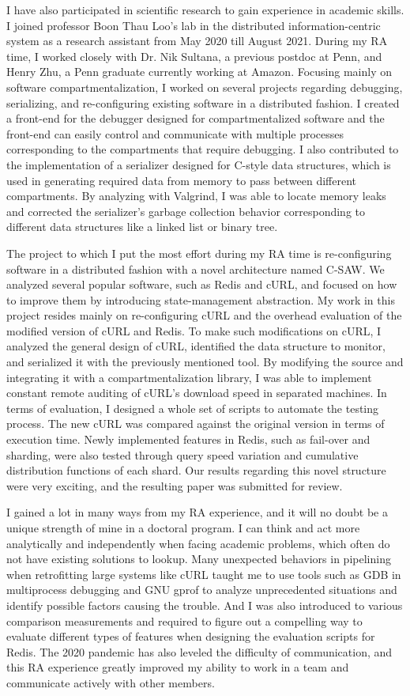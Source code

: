 \documentclass[12pt]{article}
\begin{document}
I have also participated in scientific research to gain experience in academic
skills. I joined professor Boon Thau Loo's lab in the distributed
information-centric system as a research assistant from May 2020 till August
2021. During my RA time, I worked closely with Dr. Nik Sultana, a previous
postdoc at Penn, and Henry Zhu, a Penn graduate currently working at Amazon.
Focusing mainly on software compartmentalization, I worked on several projects
regarding debugging, serializing, and re-configuring existing software in a
distributed fashion. I created a front-end for the debugger designed for
compartmentalized software and the front-end can easily control and communicate
with multiple processes corresponding to the compartments that require
debugging. I also contributed to the implementation of a serializer designed for
C-style data structures, which is used in generating required data from memory
to pass between different compartments. By analyzing with Valgrind, I was able
to locate memory leaks and corrected the serializer's garbage collection
behavior corresponding to different data structures like a linked list or binary
tree.

The project to which I put the most effort during my RA time is re-configuring
software in a distributed fashion with a novel architecture named C-SAW. We
analyzed several popular software, such as Redis and cURL, and focused on how to
improve them by introducing state-management abstraction. My work in this
project resides mainly on re-configuring cURL and the overhead evaluation of the
modified version of cURL and Redis. To make such modifications on cURL, I
analyzed the general design of cURL, identified the data structure to monitor,
and serialized it with the previously mentioned tool. By modifying the source
and integrating it with a compartmentalization library, I was able to implement
constant remote auditing of cURL's download speed in separated machines. In
terms of evaluation, I designed a whole set of scripts to automate the testing
process. The new cURL was compared against the original version in terms of
execution time. Newly implemented features in Redis, such as fail-over and
sharding, were also tested through query speed variation and cumulative
distribution functions of each shard. Our results regarding this novel structure
were very exciting, and the resulting paper was submitted for review.

I gained a lot in many ways from my RA experience, and it will no doubt be a
unique strength of mine in a doctoral program. I can think and act more
analytically and independently when facing academic problems, which often do not
have existing solutions to lookup. Many unexpected behaviors in pipelining when
retrofitting large systems like cURL taught me to use tools such as GDB in
multiprocess debugging and GNU gprof to analyze unprecedented situations and
identify possible factors causing the trouble. And I was also introduced to
various comparison measurements and required to figure out a compelling way to
evaluate different types of features when designing the evaluation scripts for
Redis. The 2020 pandemic has also leveled the difficulty of communication, and
this RA experience greatly improved my ability to work in a team and communicate
actively with other members.
\end{document}
